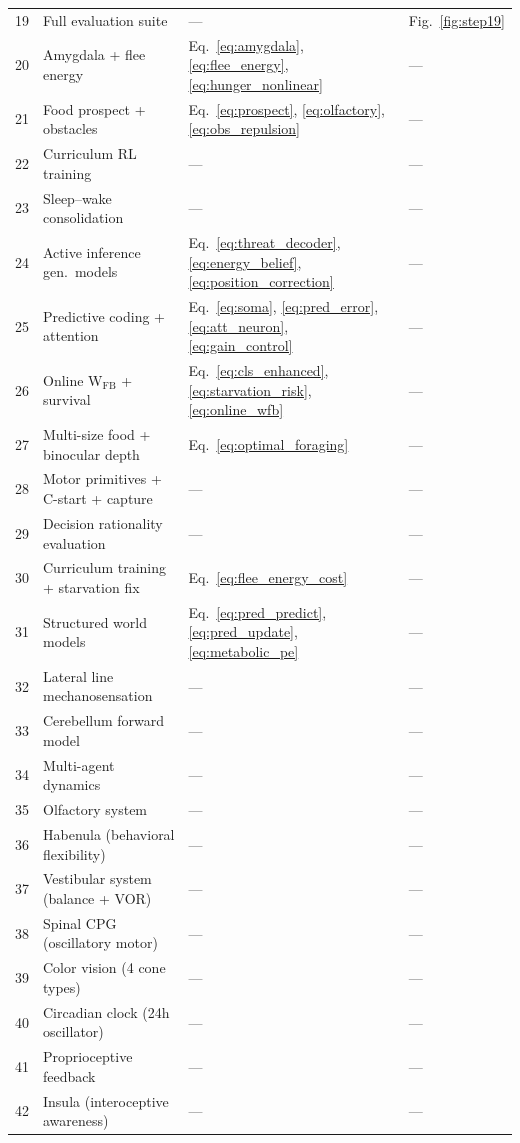 \documentclass[11pt,a4paper]{article}
\begin{document}
\begin{table}[H]
\begin{tabular}{clll}
19 & Full evaluation suite  & ---                                    & Fig.~\ref{fig:step19} \\
20 & Amygdala + flee energy & Eq.~\ref{eq:amygdala}, \ref{eq:flee_energy}, \ref{eq:hunger_nonlinear} & --- \\
21 & Food prospect + obstacles & Eq.~\ref{eq:prospect}, \ref{eq:olfactory}, \ref{eq:obs_repulsion} & --- \\
22 & Curriculum RL training & ---                                    & --- \\
23 & Sleep--wake consolidation & ---                                 & --- \\
24 & Active inference gen.\ models & Eq.~\ref{eq:threat_decoder}, \ref{eq:energy_belief}, \ref{eq:position_correction} & --- \\
25 & Predictive coding + attention & Eq.~\ref{eq:soma}, \ref{eq:pred_error}, \ref{eq:att_neuron}, \ref{eq:gain_control} & --- \\
26 & Online W$_\text{FB}$ + survival & Eq.~\ref{eq:cls_enhanced}, \ref{eq:starvation_risk}, \ref{eq:online_wfb} & --- \\
27 & Multi-size food + binocular depth & Eq.~\ref{eq:optimal_foraging} & --- \\
28 & Motor primitives + C-start + capture & --- & --- \\
29 & Decision rationality evaluation & --- & --- \\
30 & Curriculum training + starvation fix & Eq.~\ref{eq:flee_energy_cost} & --- \\
31 & Structured world models & Eq.~\ref{eq:pred_predict}, \ref{eq:pred_update}, \ref{eq:metabolic_pe} & --- \\
32 & Lateral line mechanosensation & --- & --- \\
33 & Cerebellum forward model & --- & --- \\
34 & Multi-agent dynamics & --- & --- \\
35 & Olfactory system & --- & --- \\
36 & Habenula (behavioral flexibility) & --- & --- \\
37 & Vestibular system (balance + VOR) & --- & --- \\
38 & Spinal CPG (oscillatory motor) & --- & --- \\
39 & Color vision (4 cone types) & --- & --- \\
40 & Circadian clock (24h oscillator) & --- & --- \\
41 & Proprioceptive feedback & --- & --- \\
42 & Insula (interoceptive awareness) & --- & --- \\
\bottomrule
\end{tabular}
\end{table}
\end{document}
